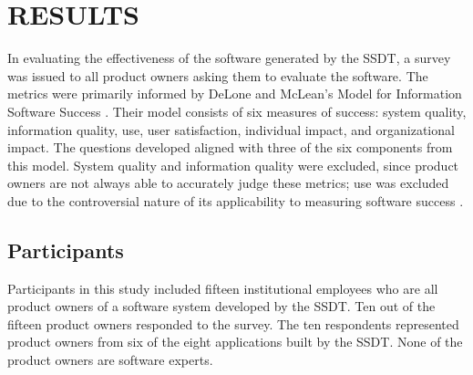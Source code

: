 \section{RESULTS}

In evaluating the effectiveness of the software generated by the SSDT, a survey was issued to all product owners asking them to evaluate the software. The metrics were primarily informed by DeLone and McLean's Model for Information Software Success \cite{delone1992softwaresuccess}. Their model consists of six measures of success: system quality, information quality, use, user satisfaction, individual impact, and organizational impact. The questions developed aligned with three of the six components from this model. System quality and information quality were excluded, since product owners are not always able to accurately judge these metrics; use was excluded due to the controversial nature of its applicability to measuring software success \cite{delone2003delone}. 

\subsection{Participants}
Participants in this study included fifteen institutional employees who are all product owners of a software system developed by the SSDT. Ten out of the fifteen product owners responded to the survey. The ten respondents represented product owners from six of the eight applications built by the SSDT. None of the product owners are software experts.

